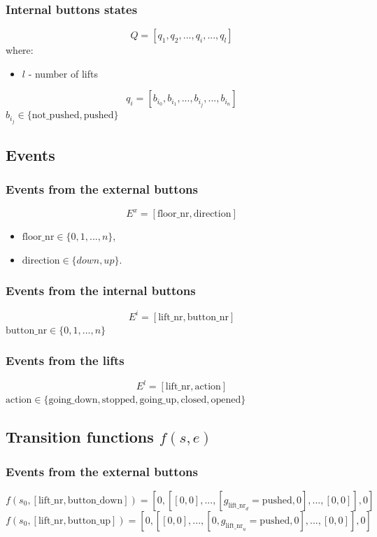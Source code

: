 \documentclass[12pt]{article}
\begin{document}
\subsubsection{Internal buttons states}
\[ Q = [q_1, q_2, ..., q_i, ..., q_l] \]
where:
\begin{itemize}
  \item \(l\) - number of lifts
\end{itemize}
\[q_i = [b_{i_0}, b_{i_1}, ..., b_{i_j}, ..., b_{i_n}] \]
\(b_{i_j} \in \{\text{not\_pushed},\text{pushed}\} \)

\subsection{Events}


\subsubsection{Events from the external buttons} 
\[ E^x = [\text{floor\_nr},\text{direction}] \]

\begin{itemize}
\item[] \(\text{floor\_nr} \in \{0, 1,..., n\}\),
\item[] \(\text{direction} \in \{down, up\}\).
\end{itemize}

\subsubsection{Events from the internal buttons}
\[ E^i = [\text{lift\_nr},\text{button\_nr}] \]
\(\text{button\_nr} \in \{0, 1,..., n\}\)

\subsubsection{Events from the lifts}
\[ E^l = [\text{lift\_nr}, \text{action}] \]
\(\text{action} \in \{\text{going\_down},\text{stopped},\text{going\_up},\text{closed},\text{opened}\}\)

\subsection{Transition functions \(f(s,e)\)}

\subsubsection{Events from the external buttons}
\[
  f(s_0,[\text{lift\_nr},\text{button\_down}]) =
  [0,[[0,0],...,[g_{\text{lift\_nr}_d}=\text{pushed},0],...,[0,0]],0]
\]
\[
  f(s_0,[\text{lift\_nr},\text{button\_up}]) =
  [0,[[0,0],...,[0,g_{\text{lift\_nr}_u}=\text{pushed},0],...,[0,0]],0]
\]
\end{document}
